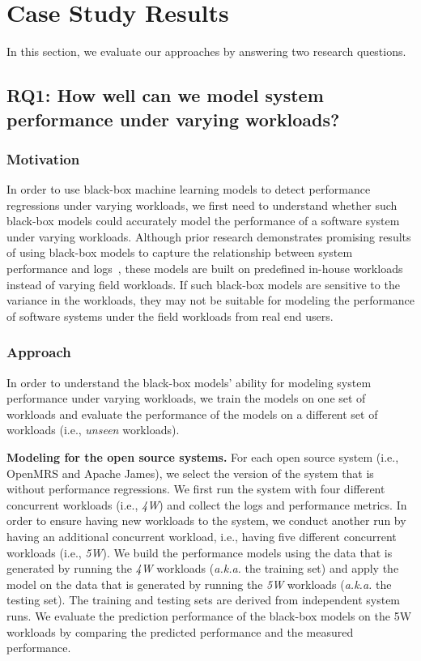 \section{Case Study Results} \label{sec:casestudyresults}
In this section, we evaluate our approaches by answering two research questions.

\subsection*{RQ1: How well can we model system performance under varying workloads?}

\subsubsection*{Motivation}
In order to use black-box machine learning models to detect performance regressions under varying workloads, we first need to understand whether such black-box models could accurately model the performance of a software system under varying workloads.
Although prior research demonstrates promising results of using black-box models to capture the relationship between system performance and logs~\citep{Yao:2018:LSL:3184407.3184416,DBLP:conf/issre/FarshchiSWG15},
these models are built on predefined in-house workloads instead of varying field workloads. 
If such black-box models are sensitive to the variance in the workloads, they may not be suitable for modeling the performance of software systems under the field workloads from real end users.

\subsubsection*{Approach}
In order to understand the black-box models' ability for modeling system performance under varying workloads, we train the models on one set of workloads and evaluate the performance of the models on a different set of workloads (i.e., \emph{unseen} workloads).

\noindent\textbf{Modeling for the open source systems. }
For each open source system (i.e., OpenMRS and Apache James), we select the version of the system that is without performance regressions. We first run the system with four different concurrent workloads (i.e., \emph{4W}) and collect the logs and performance metrics. In order to ensure having new workloads to the system, we conduct another run by having an additional concurrent workload, i.e., having five different concurrent workloads (i.e., \emph{5W}). We build the performance models using the data that is generated by running the \emph{4W} workloads (\emph{a.k.a.} the training set) and apply the model on the data that is generated by running the \emph{5W} workloads (\emph{a.k.a.} the testing set). 
The training and testing sets are derived from independent system runs. 
We evaluate the prediction performance of the black-box models on the 5W workloads by comparing the predicted performance and the measured performance.

